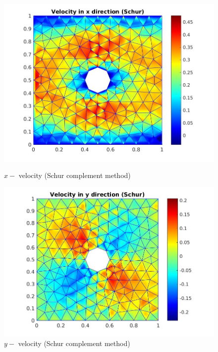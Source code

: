 \documentclass[a4paper]{book}
\begin{document}
\begin{figure}
  \begin{minipage}[c]{0.67\textwidth}
    \includegraphics[width=\textwidth]{cylinder_schur_vx.jpg}
  \end{minipage}\hfill
  \begin{minipage}[c]{0.3\textwidth}
    \caption{$x-$ velocity (Schur complement method)}
    \label{x_vel_stoke_schur}
  \end{minipage}
  \begin{minipage}[c]{0.67\textwidth}
    \includegraphics[width=\textwidth]{cylinder_schur_vy.jpg}
  \end{minipage}\hfill
  \begin{minipage}[c]{0.3\textwidth}
    \caption{$y-$ velocity (Schur complement method)}

\end{minipage}
\end{figure}
\end{document}

